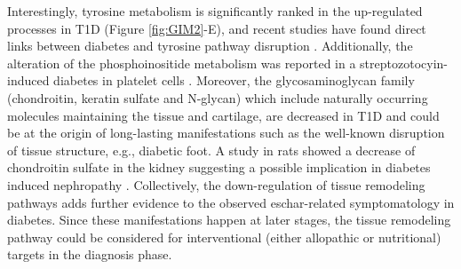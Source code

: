 Interestingly, tyrosine metabolism is significantly ranked in the up-regulated processes in T1D (Figure \ref{fig:GIM2}-E), and recent studies have found direct links between diabetes and tyrosine pathway disruption \cite{ferguson2013tatn}. Additionally, the alteration of the phosphoinositide metabolism was reported in a streptozotocyin-induced diabetes in platelet cells \cite{jethmalani1994platelet}. 
Moreover, the glycosaminoglycan family (chondroitin, keratin sulfate and N-glycan) which include naturally occurring molecules maintaining the tissue and cartilage, are decreased in T1D and could be at the origin of long-lasting manifestations such as the well-known disruption of tissue structure, e.g., diabetic foot. A study in rats showed a decrease of chondroitin sulfate in the kidney suggesting a possible implication in diabetes induced nephropathy \cite{joladarashi2011diabetes}. Collectively, the down-regulation of tissue remodeling pathways adds further evidence to the observed eschar-related symptomatology in diabetes. Since these manifestations happen at later stages, the tissue remodeling pathway \cite{gowd2016glycosaminoglycan} could be considered for interventional (either allopathic or nutritional) targets in the diagnosis phase.\\
